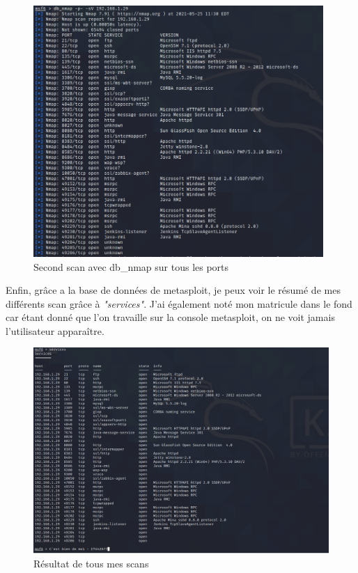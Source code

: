 \documentclass[a4paper]{article}
\begin{document}
\begin{figure}[H]
  \centering
  \includegraphics[width=11cm]{images/Rapport/kali/W2k8/4.png}
  \caption{Second scan avec db\_nmap sur tous les ports}
\end{figure}
Enfin, grâce a la base de données de metasploit, je peux voir le résumé de mes différents scan grâce à \emph{"services"}. J'ai également noté mon matricule dans le fond car étant donné que l'on travaille sur
la console metasploit, on ne voit jamais l'utilisateur apparaître.
\begin{figure}[H]
  \centering
  \includegraphics[width=13cm]{images/Rapport/kali/W2k8/5.png}
  \caption{Résultat de tous mes scans}
\end{figure}
\end{document}
